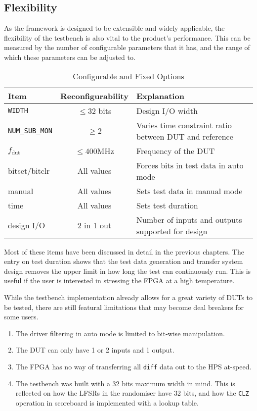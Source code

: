\subsection{Flexibility}
As the framework is designed to be extensible and widely applicable, the flexibility of the testbench is also vital to the product's performance.
This can be measured by the number of configurable parameters that it has, and the range of which these parameters can be adjusted to.

\begin{table}[H]
  \centering
  \begin{tabular}{|l|c|p{15em}|}
    \hline
    Item                  & Reconfigurability & Explanation \\
    \hline
    \texttt{WIDTH}        & $\le$32 bits & Design I/O width \\
    \texttt{NUM\_SUB\_MON}& $\ge$2       & Varies time constraint ratio between DUT and reference \\
    $f_{\text{dut}}$             & $\le$400MHz  & Frequency of the DUT \\
    bitset/bitclr         & All values & Forces bits in test data in auto mode \\
    manual                & All values & Sets test data in manual mode \\
    time                  & All values & Sets test duration \\
    design I/O            & 2 in 1 out & Number of inputs and outputs supported for design \\
    \hline
  \end{tabular}
  \caption{Configurable and Fixed Options}
  \label{ProdOpt}
\end{table}

Most of these items have been discussed in detail in the previous chapters.
The entry on test duration shows that the test data generation and transfer system design removes the upper limit in how long the test can continuously run.
This is useful if the user is interested in stressing the FPGA at a high temperature.

While the testbench implementation already allows for a great variety of DUTs to be tested, there are still featural limitations that may become deal breakers for some users.
\begin{enumerate}
  \setlength\itemsep{0pt}
  \item The driver filtering in auto mode is limited to bit-wise manipulation.
  \item The DUT can only have 1 or 2 inputs and 1 output.
  \item The FPGA has no way of transferring all \texttt{diff} data out to the HPS at-speed.
  \item The testbench was built with a 32 bits maximum width in mind.
        This is reflected on how the LFSRs in the randomiser have 32 bits, and how the \texttt{CLZ} operation in scoreboard is implemented with a lookup table.
\end{enumerate}

